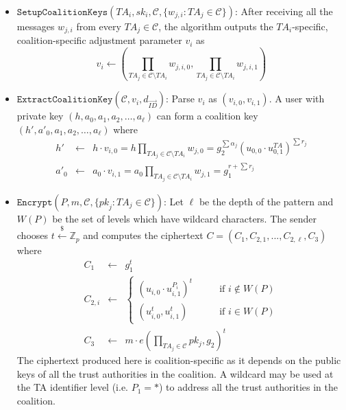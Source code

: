 \documentclass[10pt]{llncs}
\newcommand{\C}{\mathcal{C}}
\newcommand{\Zbb}{\mathbb{Z}}
\newcommand{\ID}{\mathit{ID}}
\newcommand{\TA}{\mathit{TA}}
\newcommand{\pk}{\mathit{pk}}
\newcommand{\getsr}{\stackrel{{\scriptscriptstyle\$}}{\gets}}
\begin{document}
\begin{itemize}
\item $\texttt{SetupCoalitionKeys}(\TA_i,sk_i, \C, \{w_{j,i} : \TA_j \in \C \})$: After receiving all the messages $w_{j,i}$ from every $\TA_j \in \C$, the algorithm outputs the $\TA_i$-specific, coalition-specific adjustment parameter $v_i$ as
\begin{displaymath}
    v_i \gets (\prod_{\TA_j \in \C \setminus \TA_i} w_{j,i,0},
    \prod_{\TA_j \in \C \setminus \TA_i} w_{j,i,1})
\end{displaymath}
\medskip

\item $\texttt{ExtractCoalitionKey}(\C,v_i,d_{\vec{\ID}})$: Parse $v_i$ as $(v_{i,0}, v_{i,1})$. A user with private key $(h,a_{0},a_{1},a_{2},\ldots,a_{\ell})$ can form a coalition key $(h',a'_{0},a_{1},a_{2},\ldots,a_{\ell})$ where
\begin{eqnarray*}
    h' & \gets & h \cdot v_{i,0} = h \prod_{\TA_j \in \C \setminus \TA_i} w_{j,0} = g_{2}^{\sum \alpha_{j}}(u_{0,0} \cdot u_{0,1}^{\TA})^{\sum r_{j}} \\
    a'_{0} & \gets & a_{0} \cdot v_{i,1} = a_0 \prod_{\TA_j \in \C \setminus \TA_i} w_{j,1} = g_{1}^{r+\sum r_{j}}
\end{eqnarray*}

\item $\texttt{Encrypt}(P,m, \C, \{\pk_{j} : \TA_{j} \in \C\})$: Let $\ell$ be the depth of the pattern and $W(P)$ be the set of levels which have wildcard characters. The sender chooses $t\getsr \Zbb_{p}$ and computes the ciphertext $C=(C_{1},C_{2,1},...,C_{2,\ell},C_{3})$ where
\begin{eqnarray*}
    C_{1} & \gets & g_{1}^{t} \\
    C_{2,i} & \gets & \left\{
        \begin{array}{ll}
            (u_{i,0} \cdot u_{i,1}^{P_{i}})^{t} & \qquad \mbox{if } i \notin W(P) \\
            (u_{i,0}^{t},u_{i,1}^{t}) & \qquad \mbox{if } i \in W(P)
        \end{array}
    \right. \\
    C_{3} &\gets& m \cdot e(\prod_{\TA_{j}\in \C} pk_j,g_{2})^{t}
\end{eqnarray*}
The ciphertext produced here is coalition-specific as it depends
on the public keys of all the trust authorities in the
coalition. A wildcard may be used at the TA identifier level
(i.e. $P_{1} = *$) to address all the trust authorities in the
coalition.


\end{itemize}
\end{document}
